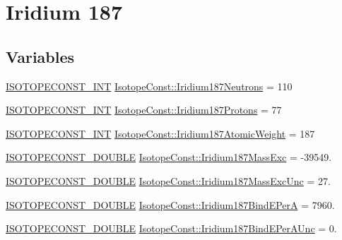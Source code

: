 \hypertarget{group___isotope_const-_iridium-_ir187}{}\section{Iridium 187}
\label{group___isotope_const-_iridium-_ir187}
\subsection*{Variables}
\begin{DoxyCompactItemize}
\item 
\mbox{\hyperlink{group___isotope_const-_macros_ga5f18360b3e99483a35c32d789e62621c}{I\+S\+O\+T\+O\+P\+E\+C\+O\+N\+S\+T\+\_\+\+I\+NT}} \mbox{\hyperlink{group___isotope_const-_iridium-_ir187_gae44c9c305ae1497706d6635a55a440f0}{Isotope\+Const\+::\+Iridium187\+Neutrons}} = 110
\item 
\mbox{\hyperlink{group___isotope_const-_macros_ga5f18360b3e99483a35c32d789e62621c}{I\+S\+O\+T\+O\+P\+E\+C\+O\+N\+S\+T\+\_\+\+I\+NT}} \mbox{\hyperlink{group___isotope_const-_iridium-_ir187_gacff19206e6957373370517a11e58c83c}{Isotope\+Const\+::\+Iridium187\+Protons}} = 77
\item 
\mbox{\hyperlink{group___isotope_const-_macros_ga5f18360b3e99483a35c32d789e62621c}{I\+S\+O\+T\+O\+P\+E\+C\+O\+N\+S\+T\+\_\+\+I\+NT}} \mbox{\hyperlink{group___isotope_const-_iridium-_ir187_ga04c1d97bb50e2e372bbee4213af6df13}{Isotope\+Const\+::\+Iridium187\+Atomic\+Weight}} = 187
\item 
\mbox{\hyperlink{group___isotope_const-_macros_ga8f45a7272ce02c0b4c65c44636ed719a}{I\+S\+O\+T\+O\+P\+E\+C\+O\+N\+S\+T\+\_\+\+D\+O\+U\+B\+LE}} \mbox{\hyperlink{group___isotope_const-_iridium-_ir187_gab1bac001daa5553597be01dc8e91230e}{Isotope\+Const\+::\+Iridium187\+Mass\+Exc}} = -\/39549.
\item 
\mbox{\hyperlink{group___isotope_const-_macros_ga8f45a7272ce02c0b4c65c44636ed719a}{I\+S\+O\+T\+O\+P\+E\+C\+O\+N\+S\+T\+\_\+\+D\+O\+U\+B\+LE}} \mbox{\hyperlink{group___isotope_const-_iridium-_ir187_gac553ec22c3c4a3c9f20c48f14b9374aa}{Isotope\+Const\+::\+Iridium187\+Mass\+Exc\+Unc}} = 27.
\item 
\mbox{\hyperlink{group___isotope_const-_macros_ga8f45a7272ce02c0b4c65c44636ed719a}{I\+S\+O\+T\+O\+P\+E\+C\+O\+N\+S\+T\+\_\+\+D\+O\+U\+B\+LE}} \mbox{\hyperlink{group___isotope_const-_iridium-_ir187_ga7f028dda2ac86e88fcd4c876a1d17807}{Isotope\+Const\+::\+Iridium187\+Bind\+E\+PerA}} = 7960.
\item 
\mbox{\hyperlink{group___isotope_const-_macros_ga8f45a7272ce02c0b4c65c44636ed719a}{I\+S\+O\+T\+O\+P\+E\+C\+O\+N\+S\+T\+\_\+\+D\+O\+U\+B\+LE}} \mbox{\hyperlink{group___isotope_const-_iridium-_ir187_ga671e381e6967e9262920fefdcfaccc9b}{Isotope\+Const\+::\+Iridium187\+Bind\+E\+Per\+A\+Unc}} = 0.

\end{DoxyCompactItemize}
